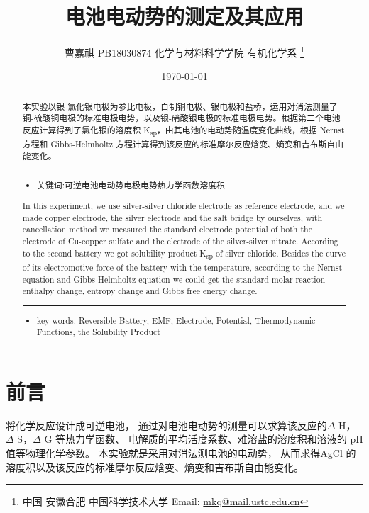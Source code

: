 \documentclass[11pt]{report}
\author{曹嘉祺 PB18030874 化学与材料科学学院 有机化学系 \thanks{中国 安徽合肥 中国科学技术大学 Email: \href{mailto:mkq@mail.ustc.edu.cn}{mkq@mail.ustc.edu.cn}}}
\date{\today}
\title{电池电动势的测定及其应用}
\begin{document}
\maketitle
\tableofcontents

\begin{abstract}
本实验以银-氯化银电极为参比电极，自制铜电极、银电极和盐桥，运用对消法测量了铜-硫酸铜电极的标准电极电势，以及银-硝酸银电极的标准电极电势。根据第二个电池反应计算得到了氯化银的溶度积 K\textsubscript{sp}，由其电池的电动势随温度变化曲线，根据 Nernst 方程和 Gibbs-Helmholtz 方程计算得到该反应的标准摩尔反应焓变、熵变和吉布斯自由能变化。


\noindent\rule{\textwidth}{0.5pt}
\begin{itemize}
\item 关键词:可逆电池\quad  电动势\quad  电极电势\quad  热力学函数\quad   溶度积
\end{itemize}
\end{abstract}
\begin{abstract}
In  this  experiment,  we  use  silver-silver  chloride  electrode  as  reference electrode, and  we  made  copper  electrode,  the  silver  electrode  and  the  salt  bridge  by ourselves,  with  cancellation  method  we  measured  the  standard  electrode  potential  of both the electrode of Cu-copper sulfate and the electrode of the silver-silver nitrate. According  to  the  second  battery  we  got  solubility  product  K\textsubscript{sp}  of  silver  chloride. Besides  the  curve  of  its  electromotive  force  of  the  battery  with  the  temperature, according  to  the  Nernst  equation  and  Gibbs-Helmholtz  equation  we  could  get  the standard  molar  reaction  enthalpy  change,  entropy  change  and  Gibbs  free  energy change.

\noindent\rule{\textwidth}{0.5pt}

\begin{itemize}
\item key words: Reversible Battery, EMF, Electrode, Potential, Thermodynamic Functions, the Solubility Product
\end{itemize}
\end{abstract}
\part{前言}
\label{sec:orgeea544c}

将化学反应设计成可逆电池，
通过对电池电动势的测量可以求算该反应的\(\Delta\) H，\(\Delta\) S，\(\Delta\) G 等热力学函数、
电解质的平均活度系数、难溶盐的溶度积和溶液的 pH 值等物理化学参数。
本实验就是采用对消法测电池的电动势，
从而求得AgCl 的溶度积以及该反应的标准摩尔反应焓变、熵变和吉布斯自由能变化。
\end{document}
